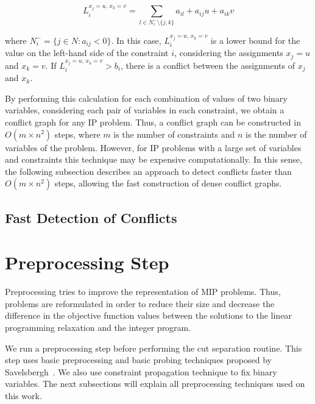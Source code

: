 \documentclass[preprint,12pt]{elsarticle}
\begin{document}
\begin{equation}\label{li}
L_{i}^{x_j = u,\, x_k = v}=\sum_{l\in N_{i}^{-} \setminus \{j, k\}}a_{il}+a_{ij}u+a_{ik}v 
\end{equation}

\noindent where $N_{i}^{-} = \{j \in N : a_{ij} < 0\}$. In this case, $L_{i}^{x_j = u,\, x_k = v}$ is a lower bound for the value on the left-hand side  of the constraint $i$, considering the assignments $x_j = u$ and $x_k = v$. If $L_{i}^{x_j = u,\, x_k = v} > b_{i}$, there is a conflict between the assignments of $x_j$ and $x_k$. 

By performing this calculation for each combination of values of two binary variables, considering each pair of variables in each constraint, we obtain a conflict graph for any IP problem. Thus, a conflict graph can be constructed in $O(m \times n^2)$ steps, where $m$ is the number of constraints and $n$ is the number of variables of the problem. However, for IP problems with a large set of variables and constraints this technique may be expensive computationally. In this sense, the following subsection describes an approach to detect conflicts faster than $O(m \times n^2)$ steps, allowing the fast construction of dense conflict graphs.

\subsection{Fast Detection of Conflicts}
























\section{Preprocessing Step}\label{preprocessing}

Preprocessing tries to improve the representation of MIP problems. Thus, problems are reformulated in order to reduce their size and decrease the difference in the objective function values between the solutions to the linear programming relaxation and the integer program.

We run a preprocessing step before performing the cut separation routine. This step uses basic preprocessing and basic probing techniques proposed by Savelsbergh~\cite{Savelsbergh1994}. We also use constraint propagation technique to fix binary variables. The next subsections will explain all preprocessing techniques used on this work.
\end{document}
